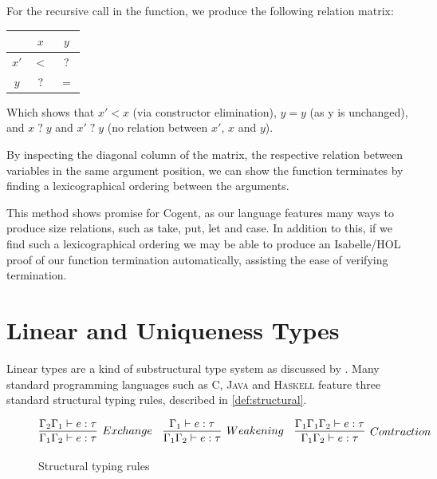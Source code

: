 For the recursive call in the function, we produce the following relation matrix:

\begin{center}
    \begin{tabular}{c|cc}
             & $x$        & $y$ \\
        \hline
        $x'$ & $<$        & \textsf{?} \\
        $y$  & \textsf{?} & $=$ \\
    \end{tabular}
\end{center}

Which shows that $x' < x$ (via constructor elimination), $y = y$ (as y is unchanged),
and $x\; \textsf{?}\; y$ and $x'\; \textsf{?}\; y$ (no relation between $x'$, $x$ and $y$).

By inspecting the diagonal column of the matrix, the respective relation between variables
in the same argument position, we can show the function terminates by finding
a lexicographical ordering between the arguments.

This method shows promise for Cogent, as our language features many ways to produce
size relations, such as \textsf{take}, \textsf{put}, \textsf{let} and \textsf{case}.
In addition to this, if we find such a lexicographical ordering we may be able
to produce an Isabelle/HOL proof of our function termination automatically,
assisting the ease of verifying termination.

\section{Linear and Uniqueness Types}

Linear types are a kind of substructural type system as discussed by \citet{Substructural}.
Many standard programming languages such as \textsc{C}, \textsc{Java} and \textsc{Haskell} feature
three standard structural typing rules, described in \autoref{def:structural}.

\begin{figure}
    \centering
    $$
        \infer[Exchange]{
            \Gamma_1\Gamma_2 \vdash e : \tau
        }{
            \Gamma_2\Gamma_1 \vdash e : \tau
        }\quad
        \infer[Weakening]{
            \Gamma_1\Gamma_2 \vdash e : \tau
        }{
            \Gamma_1 \vdash e : \tau
        }\quad
        \infer[Contraction]{
            \Gamma_1\Gamma_2 \vdash e : \tau
        }{
            \Gamma_1\Gamma_1\Gamma_2 \vdash e : \tau
        }
    $$
    \caption{Structural typing rules}
    \label{def:structural}
\end{figure}

